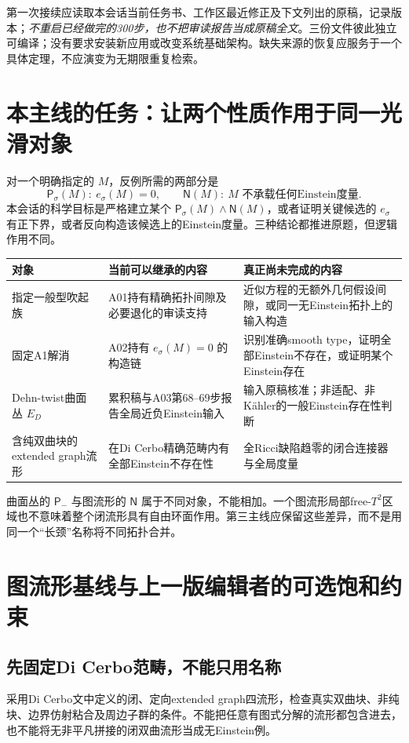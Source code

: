 \documentclass[UTF8,a4paper,11pt,fontset=fandol]{ctexart}
\numberwithin{equation}{section}
\theoremstyle{definition}
\begin{document}
第一次接续应读取本会话当前任务书、工作区最近修正及下文列出的原稿，记录版本；\emph{不重启已经做完的300步，也不把审读报告当成原稿全文}。三份文件彼此独立可编译；没有要求安装新应用或改变系统基础架构。缺失来源的恢复应服务于一个具体定理，不应演变为无期限重复检索。

\section{本主线的任务：让两个性质作用于同一光滑对象}
对一个明确指定的 $M$，反例所需的两部分是
\[
\mathsf P_\sigma(M):\ e_\sigma(M)=0,
\qquad
\mathsf N(M):\ M\text{ 不承载任何Einstein度量}.
\]
本会话的科学目标是严格建立某个 $\mathsf P_\sigma(M)\land\mathsf N(M)$，或者证明关键候选的 $e_\sigma$ 有正下界，或者反向构造该候选上的Einstein度量。三种结论都推进原题，但逻辑作用不同。

\begin{longtable}{L{.22\textwidth}L{.34\textwidth}L{.35\textwidth}}
\toprule 对象 & 当前可以继承的内容 & 真正尚未完成的内容\\\midrule\endhead
指定一般型吹起族 & A01持有精确拓扑间隙及必要退化的审读支持 & 近似方程的无额外几何假设间隙，或同一无Einstein拓扑上的输入构造\\
固定A1解消 & A02持有 $e_\sigma(M)=0$ 的构造链 & 识别准确smooth type，证明全部Einstein不存在，或证明某个Einstein存在\\
Dehn-twist曲面丛 $E_D$ & 累积稿与A03第68--69步报告全局近负Einstein输入 & 输入原稿核准；非适配、非K\"ahler的一般Einstein存在性判断\\
含纯双曲块的extended graph流形 & 在Di Cerbo精确范畴内有全部Einstein不存在性 & 全Ricci缺陷趋零的闭合连接器与全局度量\\\bottomrule
\end{longtable}
曲面丛的 $\mathsf P_-$ 与图流形的 $\mathsf N$ 属于不同对象，不能相加。一个图流形局部free-$T^2$区域也不意味着整个闭流形具有自由环面作用。第三主线应保留这些差异，而不是用同一个“长颈”名称将不同拓扑合并。

\section{图流形基线与上一版编辑者的可选饱和约束}
\subsection{先固定Di Cerbo范畴，不能只用名称}
采用Di Cerbo文中定义的闭、定向extended graph四流形，检查真实双曲块、非纯块、边界仿射粘合及周边子群的条件\cite{DiCerbo}。不能把任意有图式分解的流形都包含进去，也不能将无非平凡拼接的闭双曲流形当成无Einstein例。
\end{document}
